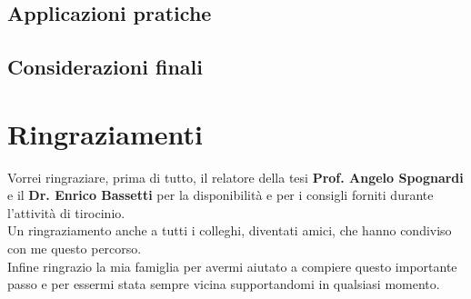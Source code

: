 \documentclass[binding=0.6cm]{sapthesis}
\begin{document}
    \section{Applicazioni pratiche}
    \section{Considerazioni finali}

\chapter*{Ringraziamenti}
\begin{large}
Vorrei ringraziare, prima di tutto, il relatore della tesi \textbf{Prof. Angelo Spognardi} e il \textbf{Dr. Enrico Bassetti} per la disponibilità e per i consigli forniti durante l'attività di tirocinio. \\

Un ringraziamento anche a tutti i colleghi, diventati amici, che hanno condiviso con me questo percorso. \\

Infine ringrazio la mia famiglia per avermi aiutato a compiere questo importante passo e per essermi stata sempre vicina supportandomi in qualsiasi momento.
\end{large}


\backmatter
{}



\end{document}
